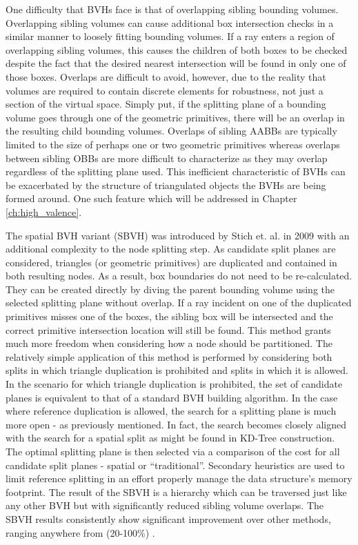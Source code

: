One difficulty that BVHs face is that of overlapping sibling bounding
volumes. Overlapping sibling volumes can cause additional box intersection
checks in a similar manner to loosely fitting bounding volumes. If a ray enters
a region of overlapping sibling volumes, this causes the children of both boxes
to be checked despite the fact that the desired nearest intersection will be
found in only one of those boxes. Overlaps are difficult to avoid, however, due
to the reality that volumes are required to contain discrete elements for
robustness, not just a section of the virtual space. Simply put, if the
splitting plane of a bounding volume goes through one of the geometric
primitives, there will be an overlap in the resulting child bounding
volumes. Overlaps of sibling AABBs are typically limited to the size of perhaps
one or two geometric primitives whereas overlaps between sibling OBBs are more
difficult to characterize as they may overlap regardless of the splitting plane
used. This inefficient characteristic of BVHs can be exacerbated by the
structure of triangulated objects the BVHs are being formed around. One such
feature which will be addressed in Chapter \ref{ch:high_valence}.

The spatial BVH variant (SBVH) was introduced by Stich et. al. in 2009
\cite{Stich_2009} with an additional complexity to the node splitting step. As
candidate split planes are considered, triangles (or geometric primitives) are
duplicated and contained in both resulting nodes. As a result, box boundaries do
not need to be re-calculated. They can be created directly by diving the parent
bounding volume using the selected splitting plane without overlap.  If a ray
incident on one of the duplicated primitives misses one of the boxes, the
sibling box will be intersected and the correct primitive intersection location
will still be found. This method grants much more freedom when considering how a
node should be partitioned. The relatively simple application of this method is
performed by considering both splits in which triangle duplication is prohibited
and splits in which it is allowed. In the scenario for which triangle
duplication is prohibited, the set of candidate planes is equivalent to that of
a standard BVH building algorithm. In the case where reference duplication is
allowed, the search for a splitting plane is much more open - as previously
mentioned. In fact, the search becomes closely aligned with the search for
a spatial split as might be found in KD-Tree construction. The optimal
splitting plane is then selected via a comparison of the cost for all
candidate split planes - spatial or ``traditional''. Secondary heuristics are
used to limit reference splitting in an effort properly manage the data
structure's memory footprint. The result of the SBVH is a hierarchy which can be
traversed just like any other BVH but with significantly reduced sibling volume
overlaps. The SBVH results consistently show significant improvement over other
methods, ranging anywhere from (20-100\%) \cite{Stich_2009}.


